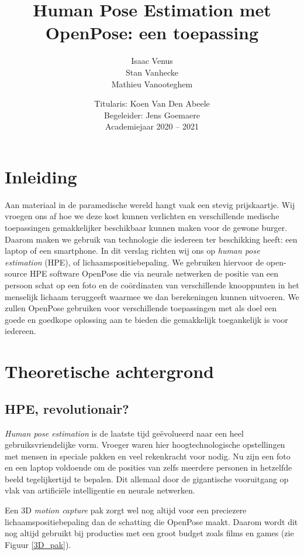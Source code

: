 \documentclass[a4paper,twoside,kulak]{kulakreport}
\title{Human Pose Estimation met OpenPose: een toepassing}
\subtitle{}
\author{Isaac Venus\\Stan Vanhecke\\Mathieu Vanooteghem}
\institute{KU Leuven Kulak, Wetenschap \& Technologie}
\date{Titularis: Koen Van Den Abeele\\Begeleider: Jens Goemaere\\Academiejaar 2020 -- 2021}
\begin{document}

\titlepage

\tableofcontents

\chapter*{Inleiding}
Aan materiaal in de paramedische wereld hangt vaak een stevig prijskaartje. Wij vroegen ons af hoe we deze kost kunnen verlichten en verschillende medische toepassingen gemakkelijker beschikbaar kunnen maken voor de gewone burger. Daarom maken we gebruik van technologie die iedereen ter beschikking heeft: een laptop of een smartphone.
In dit verslag richten wij ons op \emph{human pose estimation} (HPE), of lichaamspositiebepaling. We gebruiken hiervoor de open-source HPE software OpenPose die via neurale netwerken de positie van een persoon schat op een foto en de coördinaten van verschillende knooppunten in het menselijk lichaam teruggeeft waarmee we dan berekeningen kunnen uitvoeren. We zullen OpenPose gebruiken voor verschillende toepassingen met als doel een goede en goedkope oplossing aan te bieden die gemakkelijk toegankelijk is voor iedereen.

\chapter{Theoretische achtergrond}
\section{HPE, revolutionair?}
\emph{Human pose estimation} is de laatste tijd geëvolueerd naar een heel gebruiksvriendelijke vorm. Vroeger waren hier hoogtechnologische opstellingen met mensen in speciale pakken en veel rekenkracht voor nodig. Nu zijn een foto en een laptop voldoende om de posities van zelfs meerdere personen in hetzelfde beeld tegelijkertijd te bepalen. Dit allemaal door de gigantische vooruitgang op vlak van artificiële intelligentie en neurale netwerken.

Een 3D \emph{motion capture} pak zorgt wel nog altijd voor een preciezere lichaamspositiebepaling dan de schatting die OpenPose maakt. Daarom wordt dit nog altijd gebruikt bij producties met een groot budget zoals films en games (zie Figuur \ref{3D_pak}).
\end{document}
